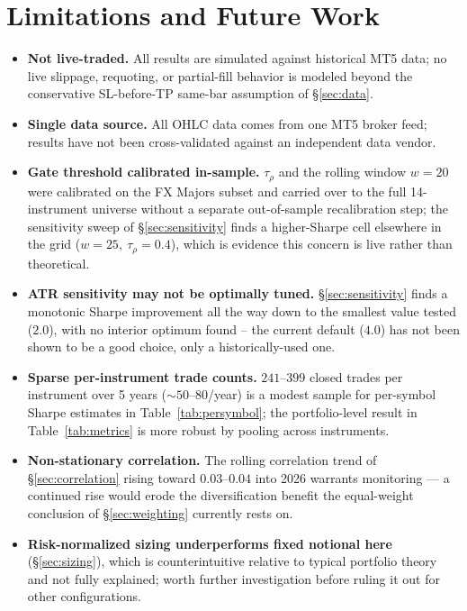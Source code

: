 \documentclass[11pt]{article}
\begin{document}
\section{Limitations and Future Work}
\label{sec:limitations}
\begin{itemize}[nosep]
  \item \textbf{Not live-traded.} All results are simulated against historical MT5 data; no live
  slippage, requoting, or partial-fill behavior is modeled beyond the conservative SL-before-TP
  same-bar assumption of \S\ref{sec:data}.
  \item \textbf{Single data source.} All OHLC data comes from one MT5 broker feed; results have not
  been cross-validated against an independent data vendor.
  \item \textbf{Gate threshold calibrated in-sample.} $\tau_\rho$ and the rolling window $w=20$ were
  calibrated on the FX Majors subset and carried over to the full 14-instrument universe without a
  separate out-of-sample recalibration step; the sensitivity sweep of \S\ref{sec:sensitivity} finds a
  higher-Sharpe cell elsewhere in the grid ($w=25,\ \tau_\rho=0.4$), which is evidence this concern is
  live rather than theoretical.
  \item \textbf{ATR sensitivity may not be optimally tuned.} \S\ref{sec:sensitivity} finds a
  monotonic Sharpe improvement all the way down to the smallest value tested ($2.0$), with no interior
  optimum found -- the current default ($4.0$) has not been shown to be a good choice, only a
  historically-used one.
  \item \textbf{Sparse per-instrument trade counts.} $241$--$399$ closed trades per instrument over 5
  years ($\sim\!50$--$80$/year) is a modest sample for per-symbol Sharpe estimates in
  Table~\ref{tab:persymbol}; the portfolio-level result in Table~\ref{tab:metrics} is more robust by
  pooling across instruments.
  \item \textbf{Non-stationary correlation.} The rolling correlation trend of \S\ref{sec:correlation}
  rising toward $0.03$--$0.04$ into 2026 warrants monitoring --- a continued rise would erode the
  diversification benefit the equal-weight conclusion of \S\ref{sec:weighting} currently rests on.
  \item \textbf{Risk-normalized sizing underperforms fixed notional here} (\S\ref{sec:sizing}), which
  is counterintuitive relative to typical portfolio theory and not fully explained; worth further
  investigation before ruling it out for other configurations.
\end{itemize}
\end{document}
